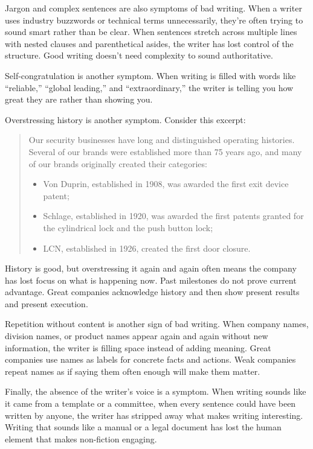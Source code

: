 Jargon and complex sentences are also symptoms of bad writing. When a writer uses industry buzzwords or technical terms unnecessarily, they're often trying to sound smart rather than be clear. When sentences stretch across multiple lines with nested clauses and parenthetical asides, the writer has lost control of the structure. Good writing doesn't need complexity to sound authoritative.

Self-congratulation is another symptom. When writing is filled with words like ``reliable,'' ``global leading,'' and ``extraordinary,'' the writer is telling you how great they are rather than showing you. 

Overstressing history is another symptom. Consider this excerpt:

\begin{quote}
Our security businesses have long and distinguished operating histories. Several of our brands were established more than 75 years ago, and many of our brands originally created their categories:
\begin{itemize}
    \item Von Duprin, established in 1908, was awarded the first exit device patent;
    \item Schlage, established in 1920, was awarded the first patents granted for the cylindrical lock and the push button lock;
    \item LCN, established in 1926, created the first door closure.
\end{itemize}
\end{quote}

History is good, but overstressing it again and again often means the company has lost focus on what is happening now. Past milestones do not prove current advantage. Great companies acknowledge history and then show present results and present execution.

Repetition without content is another sign of bad writing. When company names, division names, or product names appear again and again without new information, the writer is filling space instead of adding meaning. Great companies use names as labels for concrete facts and actions. Weak companies repeat names as if saying them often enough will make them matter.

Finally, the absence of the writer's voice is a symptom. When writing sounds like it came from a template or a committee, when every sentence could have been written by anyone, the writer has stripped away what makes writing interesting. Writing that sounds like a manual or a legal document has lost the human element that makes non-fiction engaging.

